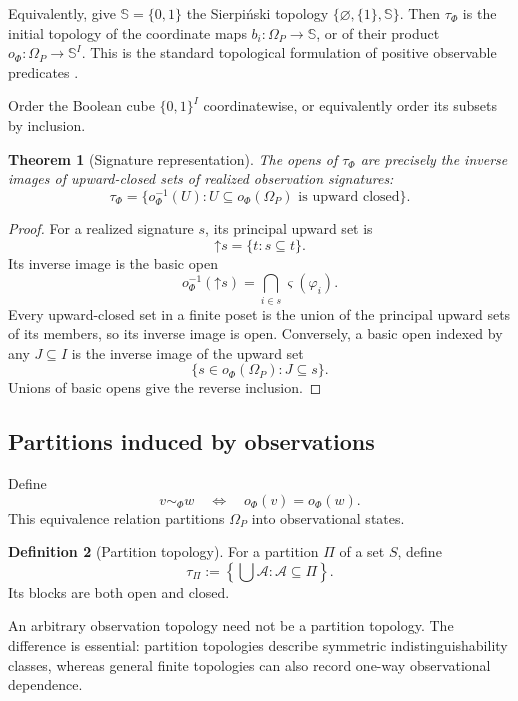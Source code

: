 \documentclass[11pt]{article}
\theoremstyle{definition}
\newtheorem{definition}{Definition}[section]
\theoremstyle{plain}
\newtheorem{theorem}[definition]{Theorem}
\theoremstyle{remark}
\begin{document}
Equivalently, give $\mathbb S=\{0,1\}$ the Sierpi\'nski topology
$\{\varnothing,\{1\},\mathbb S\}$.  Then $\tau_\Phi$ is the initial topology of
the coordinate maps $b_i:\Omega_P\to\mathbb S$, or of their product
$o_\Phi:\Omega_P\to\mathbb S^I$.  This is the standard topological formulation
of positive observable predicates \cite[Example~1.12(3)]{Vickers2007}.

Order the Boolean cube $\{0,1\}^I$ coordinatewise, or equivalently order its
subsets by inclusion.

\begin{theorem}[Signature representation]
The opens of $\tau_\Phi$ are precisely the inverse images of upward-closed sets of
realized observation signatures:
\[
  \tau_\Phi
  =\{o_\Phi^{-1}(U):U\subseteq o_\Phi(\Omega_P)
       \text{ is upward closed}\}.
\]
\end{theorem}

\begin{proof}
For a realized signature $s$, its principal upward set is
\[
  \mathord\uparrow s
  =\{t:s\subseteq t\}.
\]
Its inverse image is the basic open
\[
  o_\Phi^{-1}(\mathord\uparrow s)
  =\bigcap_{i\in s}\varsigma(\varphi_i).
\]
Every upward-closed set in a finite poset is the union of the principal upward
sets of its members, so its inverse image is open.  Conversely, a basic open
indexed by any $J\subseteq I$ is the inverse image of the upward set
\[
 \{s\in o_\Phi(\Omega_P):J\subseteq s\}.
\]
Unions of basic opens give the reverse inclusion.
\end{proof}

\subsection{Partitions induced by observations}

Define
\[
  v\sim_\Phi w
  \quad\Longleftrightarrow\quad
  o_\Phi(v)=o_\Phi(w).
\]
This equivalence relation partitions $\Omega_P$ into observational states.

\begin{definition}[Partition topology]
For a partition $\Pi$ of a set $S$, define
\[
  \tau_\Pi:=\left\{\bigcup\mathcal A:\mathcal A\subseteq\Pi\right\}.
\]
Its blocks are both open and closed.
\end{definition}

An arbitrary observation topology need not be a partition topology.  The
difference is essential: partition topologies describe symmetric
indistinguishability classes, whereas general finite topologies can also record
one-way observational dependence.
\end{document}
